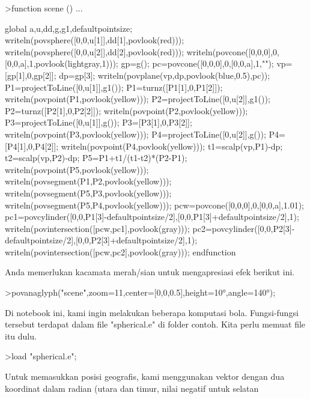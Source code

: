 \documentclass[12pt,arial,letterpaper]{book}
\begin{document}
\begin{eulernootebook}
\begin{eulercomment}
\begin{eulercomment}
\begin{eulernootebook}
\begin{eulercomment}
\begin{eulercomment}
\begin{eulercomment}
\begin{eulercomment}
\begin{eulercomment}
\begin{eulercomment}
\begin{eulernotebook}
\begin{eulercomment}
\begin{eulercomment}
\begin{eulercomment}
\begin{eulercomment}
\begin{eulercomment}
\begin{eulercomment}
\begin{eulerprompt}
>function scene () ...
\end{eulerprompt}
\begin{eulerudf}
  global a,u,dd,g,g1,defaultpointsize;
  writeln(povsphere([0,0,u[1]],dd[1],povlook(red)));
  writeln(povsphere([0,0,u[2]],dd[2],povlook(red)));
  writeln(povcone([0,0,0],0,[0,0,a],1,povlook(lightgray,1)));
  gp=g();
  pc=povcone([0,0,0],0,[0,0,a],1,"");
  vp=[gp[1],0,gp[2]]; dp=gp[3];
  writeln(povplane(vp,dp,povlook(blue,0.5),pc));
  P1=projectToLine([0,u[1]],g1()); P1=turnz([P1[1],0,P1[2]]);
  writeln(povpoint(P1,povlook(yellow)));
  P2=projectToLine([0,u[2]],g1()); P2=turnz([P2[1],0,P2[2]]);
  writeln(povpoint(P2,povlook(yellow)));
  P3=projectToLine([0,u[1]],g()); P3=[P3[1],0,P3[2]];
  writeln(povpoint(P3,povlook(yellow)));
  P4=projectToLine([0,u[2]],g()); P4=[P4[1],0,P4[2]];
  writeln(povpoint(P4,povlook(yellow)));
  t1=scalp(vp,P1)-dp; t2=scalp(vp,P2)-dp; P5=P1+t1/(t1-t2)*(P2-P1);
  writeln(povpoint(P5,povlook(yellow)));
  writeln(povsegment(P1,P2,povlook(yellow)));
  writeln(povsegment(P5,P3,povlook(yellow)));
  writeln(povsegment(P5,P4,povlook(yellow)));
  pcw=povcone([0,0,0],0,[0,0,a],1.01);
  pc1=povcylinder([0,0,P1[3]-defaultpointsize/2],[0,0,P1[3]+defaultpointsize/2],1);
  writeln(povintersection([pcw,pc1],povlook(gray)));
  pc2=povcylinder([0,0,P2[3]-defaultpointsize/2],[0,0,P2[3]+defaultpointsize/2],1);
  writeln(povintersection([pcw,pc2],povlook(gray)));
  endfunction
\end{eulerudf}
\begin{eulercomment}
Anda memerlukan kacamata merah/sian untuk mengapresiasi efek berikut
ini.
\end{eulercomment}
\begin{eulerprompt}
>povanaglyph("scene",zoom=11,center=[0,0,0.5],height=10°,angle=140°);
\end{eulerprompt}
\begin{eulercomment}
Di notebook ini, kami ingin melakukan beberapa komputasi bola.
Fungsi-fungsi tersebut terdapat dalam file "spherical.e" di folder
contoh. Kita perlu memuat file itu dulu.
\end{eulercomment}
\begin{eulerprompt}
>load "spherical.e";
\end{eulerprompt}
\begin{eulercomment}
Untuk memasukkan posisi geografis, kami menggunakan vektor dengan dua
koordinat dalam radian (utara dan timur, nilai negatif untuk selatan

\end{eulercomment}
\end{eulercomment}
\end{eulercomment}
\end{eulercomment}
\end{eulercomment}
\end{eulercomment}
\end{eulercomment}
\end{eulernotebook}
\end{eulercomment}
\end{eulercomment}
\end{eulercomment}
\end{eulercomment}
\end{eulercomment}
\end{eulercomment}
\end{eulernootebook}
\end{eulercomment}
\end{eulercomment}
\end{eulernootebook}
\end{document}
